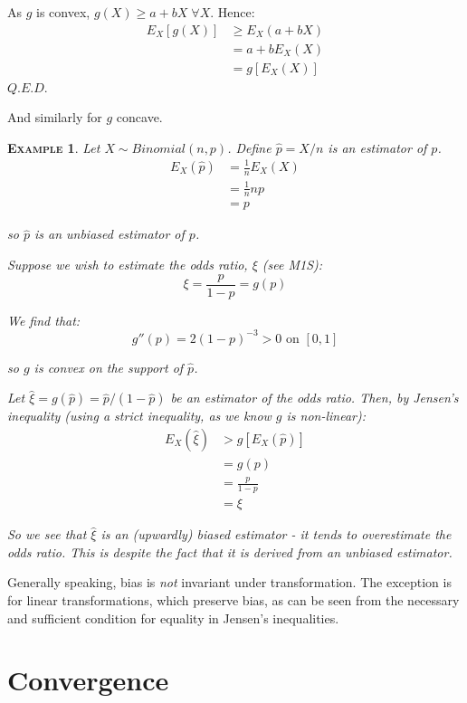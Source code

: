 \documentclass[12pt,a4paper]{article}
\newtheorem{example}{\textsc{Example}}[section]
\begin{document}
As $g$ is convex, $g(X)\geq a+bX\;\forall X$. Hence:
\begin{align*}
E_X[g(X)] &\geq E_X(a+bX)\\
&=a+bE_X(X)\\
&= g[E_X(X)]
\end{align*}\hfill$Q.E.D.$

And similarly for $g$ concave.

\begin{example}

Let $X\sim Binomial(n,p)$. Define $\hat{p} = X/n$ is an estimator of $p$.
\begin{align*}
E_X(\hat{p}) &= \frac{1}{n}E_X(X)\\
&= \frac{1}{n}np\\
&= p
\end{align*}

so $\hat{p}$ is an unbiased estimator of $p$.

Suppose we wish to estimate the odds ratio, $\xi$ (see M1S):
$$\xi = \frac{p}{1-p}=g(p)$$

We find that:
$$g''(p) = 2(1-p)^{-3} >0 \mbox{ on $[0,1]$}$$

so $g$ is convex on the support of $\hat{p}$.

Let $\hat{\xi} = g(\hat{p}) = \hat{p}/(1-\hat{p})$ be an estimator of the odds ratio. Then, by Jensen's inequality (using a strict inequality, as we know $g$ is non-linear):
\begin{align*}
E_X\left(\hat{\xi}\right) &> g[E_X(\hat{p})]\\
&= g(p)\\
&= \frac{p}{1-p}\\
&= \xi
\end{align*}

So we see that $\hat{\xi}$ is an (upwardly) biased estimator - it tends to overestimate the odds ratio. This is despite the fact that it is derived from an unbiased estimator.

\end{example}

Generally speaking, bias is \emph{not} invariant under transformation. The exception is for linear transformations, which preserve bias, as can be seen from the necessary and sufficient condition for equality in Jensen's inequalities.


\clearpage
\section{Convergence}$\;$
\end{document}
